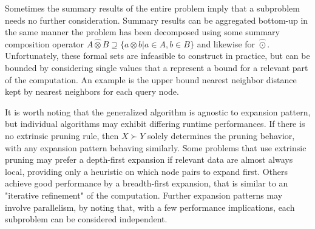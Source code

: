 \documentclass[times, leqno,twocolumn]{article}
\newcommand{\otimeshat}{\widehat{\otimes}}
\newcommand{\odothat}{\widehat{\odot}}
\newcommand{\prefsplit}[2]{#1 \succ #2}
\newcommand{\summary}{\hat{\sigma}}
\newcommand{\gnp}{\psi_{\Theta}}
\newcommand{\kdroot}[1]{#1^{\text{root}}}
\newcommand{\outstat}{\sigma}
\begin{document}
Sometimes the summary results of the entire problem imply that a subproblem needs no further consideration.
Summary results can be aggregated bottom-up in the same manner the problem has been decomposed using some summary composition operator $A \otimeshat B \supseteq \{a \otimes b | a \in A, b \in B\}$ and likewise for $\odothat$.
Unfortunately, these formal sets are infeasible to construct in practice, but can be bounded by considering single values that a represent a bound for a relevant part of the computation.
An example is the upper bound nearest neighbor distance kept by nearest neighbors for each query node.

It is worth noting that the generalized algorithm is agnostic to expansion pattern, but individual algorithms may exhibit differing runtime performances.
If there is no extrinsic pruning rule, then $\prefsplit{X}{Y}$ solely determines the pruning behavior, with any expansion pattern behaving similarly.
Some problems that use extrinsic pruning may prefer a depth-first expansion if relevant data are almost always local, providing only a heuristic on which node pairs to expand first.
Others achieve good performance by a breadth-first expansion, that is similar to an "iterative refinement" of the computation.
Further expansion patterns may involve parallelism, by noting that, with a few performance implications, each subproblem can be considered independent.

\end{document}
